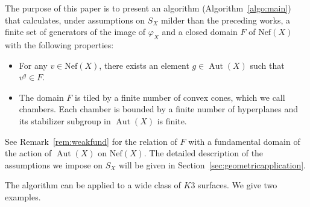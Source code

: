 \documentclass{amsart}
\theoremstyle{plain}
\theoremstyle{definition}
\theoremstyle{remark}
\numberwithin{equation}{section}
\numberwithin{table}{section}
\numberwithin{figure}{section}
\newcommand{\Aut}{\operatorname{\mathrm {Aut}}\nolimits}
\newcommand{\Nef}{\mathord{\mathrm{Nef}}}
\begin{document}
The purpose of this paper is to present an algorithm (Algorithm~\ref{algo:main})
that calculates, under   assumptions on $S_X$  milder than  the preceding works,
 a  finite set of generators of the image of $\varphi_X$
and a closed domain $F$ of  $\Nef(X)$ with the following properties:
%
\begin{itemize}
\item[(i)] For any $v\in \Nef(X)$, there exists an element $g\in \Aut(X)$ such that $v^g\in F$.
%
\item[(ii)] The domain $F$ is tiled by a finite number of convex cones, which we call chambers.
Each chamber is bounded by  a finite number of hyperplanes  and its stabilizer subgroup in $\Aut(X)$ is finite.
%
\end{itemize}
%
See Remark~\ref{rem:weakfund}
for the relation of $F$ with a fundamental domain of 
the action of $\Aut(X)$ on $\Nef(X)$.
The detailed description of the assumptions we impose on $S_X$ 
will be given  in Section~\ref{sec:geometricapplication}.
\par
The algorithm can be applied to a wide class of $K3$ surfaces.
We give two examples. 
%
%
%
%
\end{document}
